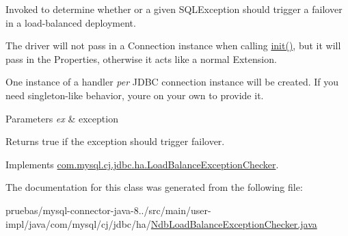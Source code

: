 Invoked to determine whether or a given S\+Q\+L\+Exception should trigger a failover in a load-\/balanced deployment.

The driver will not pass in a Connection instance when calling \mbox{\hyperlink{classcom_1_1mysql_1_1cj_1_1jdbc_1_1ha_1_1_standard_load_balance_exception_checker_af2f4516746c3615d1a4f3a191805b374}{init()}}, but it will pass in the Properties, otherwise it acts like a normal Extension.

One instance of a handler {\itshape per} J\+D\+BC connection instance will be created. If you need singleton-\/like behavior, you\textquotesingle{}re on your own to provide it.


\begin{DoxyParams}{Parameters}
{\em ex} & exception \\
\hline
\end{DoxyParams}
\begin{DoxyReturn}{Returns}
true if the exception should trigger failover. 
\end{DoxyReturn}


Implements \mbox{\hyperlink{interfacecom_1_1mysql_1_1cj_1_1jdbc_1_1ha_1_1_load_balance_exception_checker_a5d8bf713d492a85c62b52278437c4e60}{com.\+mysql.\+cj.\+jdbc.\+ha.\+Load\+Balance\+Exception\+Checker}}.



The documentation for this class was generated from the following file\+:\begin{DoxyCompactItemize}
\item 
pruebas/mysql-\/connector-\/java-\/8../src/main/user-\/impl/java/com/mysql/cj/jdbc/ha/\mbox{\hyperlink{_ndb_load_balance_exception_checker_8java}{Ndb\+Load\+Balance\+Exception\+Checker.\+java}}\end{DoxyCompactItemize}
